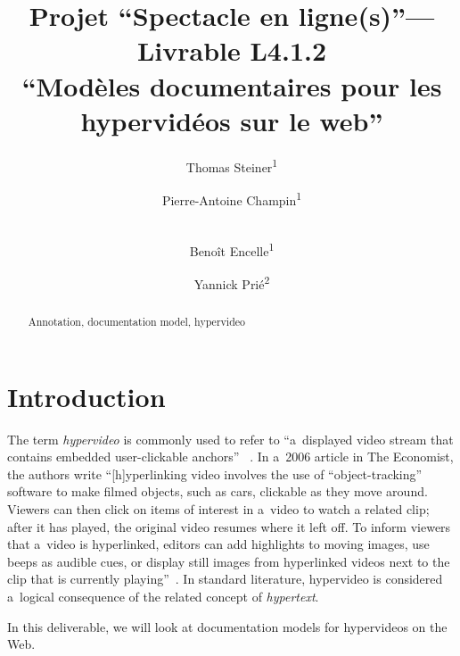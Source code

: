 \documentclass[runningheads,a4paper]{llncs}
\newcommand{\keywords}[1]{\par\addvspace\baselineskip
\noindent\keywordname\enspace\ignorespaces#1}
\begin{document}
\mainmatter  %

\title{Projet ``Spectacle en ligne(s)''---Livrable L4.1.2\\``Modèles documentaires pour les hypervidéos sur le web''}


\author{
  Thomas Steiner\textsuperscript{1} \and
  Pierre-Antoine Champin\textsuperscript{1} \and \\
  Benoît Encelle\textsuperscript{1}\and
  Yannick Prié\textsuperscript{2}
}
%


\maketitle


\begin{abstract}
\keywords{Annotation, documentation model, hypervideo}
\end{abstract}


\section{Introduction}

The term \emph{hypervideo} is commonly used to refer to
``a~displayed video stream that contains embedded user-clickable anchors''%
~\cite{sawhney1996hypercafe,smith2002extensible}.
In a~2006 article in The Economist, the authors write 
``[h]yperlinking video involves the use of ``object-tracking'' software
to make filmed objects, such as cars, clickable as they move around.
Viewers can then click on items of interest in a~video
to watch a related clip; after it has played,
the original video resumes where it left off.
To inform viewers that a~video is hyperlinked,
editors can add highlights to moving images, use beeps as audible cues,
or display still images from hyperlinked videos
next to the clip that is currently playing''~\cite{economist2006hypervideo}.
In standard literature, hypervideo is considered a~logical consequence
of the related concept of \emph{hypertext}.

In this deliverable, we will look at
documentation models for hypervideos on the Web.




\end{document}
